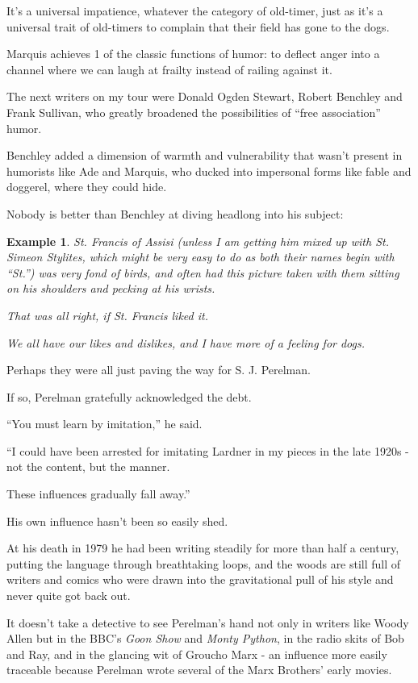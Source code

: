 \documentclass{book}
\numberwithin{equation}{section}
\newtheorem{example}{Example}[chapter]
\begin{document}
It's a universal impatience, whatever the category of old-timer, just as it's a universal trait of old-timers to complain that their field has gone to the dogs.

Marquis achieves 1 of the classic functions of humor: to deflect anger into a channel where we can laugh at frailty instead of railing against it.

%
The next writers on my tour were Donald Ogden Stewart, Robert Benchley and Frank Sullivan, who greatly broadened the possibilities of ``free association'' humor.

Benchley added a dimension of warmth and vulnerability that wasn't present in humorists like Ade and Marquis, who ducked into impersonal forms like fable and doggerel, where they could hide.

Nobody is better than Benchley at diving headlong into his subject:
\begin{example}
    St. Francis of Assisi (unless I am getting him mixed up with St. Simeon Stylites, which might be very easy to do as both their names begin with ``St.'') was very fond of birds, and often had this picture taken with them sitting on his shoulders and pecking at his wrists.
    
    That was all right, if St. Francis liked it.
    
    We all have our likes and dislikes, and I have more of a feeling for dogs.    
\end{example}
Perhaps they were all just paving the way for S. J. Perelman.

If so, Perelman gratefully acknowledged the debt.

``You must learn by imitation,'' he said.

``I could have been arrested for imitating Lardner in my pieces in the late 1920s - not the content, but the manner.

These influences gradually fall away.''

%
His own influence hasn't been so easily shed.

At his death in 1979 he had been writing steadily for more than half a century, putting the language through breathtaking loops, and the woods are still full of writers and comics who were drawn into the gravitational pull of his style and never quite got back out.

It doesn't take a detective to see Perelman's hand not only in writers like Woody Allen but in the BBC's \textit{Goon Show} and \textit{Monty Python}, in the radio skits of Bob and Ray, and in the glancing wit of Groucho Marx - an influence more easily traceable because Perelman wrote several of the Marx Brothers' early movies.
\end{document}
